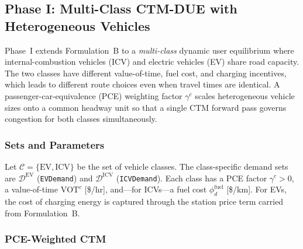 \subsection{Phase I: Multi-Class CTM-DUE with Heterogeneous Vehicles}
\label{sec:evpt-phase1-multiclass}

Phase~I extends Formulation~B to a \emph{multi-class} dynamic user
equilibrium where internal-combustion vehicles (ICV) and electric vehicles
(EV) share road capacity. The two classes have different value-of-time,
fuel cost, and charging incentives, which leads to different route choices
even when travel times are identical. A passenger-car-equivalence (PCE)
weighting factor \(\gamma^c\) scales heterogeneous vehicle sizes onto a
common headway unit so that a single CTM forward pass governs congestion for
both classes simultaneously.

\subsubsection{Sets and Parameters}

Let \(\mathcal{C}=\{\mathrm{EV},\mathrm{ICV}\}\) be the set of vehicle
classes. The class-specific demand sets are
\(\mathcal{D}^{\mathrm{EV}}\) (\texttt{EVDemand}) and
\(\mathcal{D}^{\mathrm{ICV}}\) (\texttt{ICVDemand}).
Each class has a PCE factor \(\gamma^c>0\), a value-of-time
\(\mathrm{VOT}^c\) [\$/hr], and—for ICVs—a fuel cost \(\phi^{\mathrm{fuel}}_d\)
[\$/km]. For EVs, the cost of charging energy is captured through the station
price term carried from Formulation~B.

\subsubsection{PCE-Weighted CTM}

